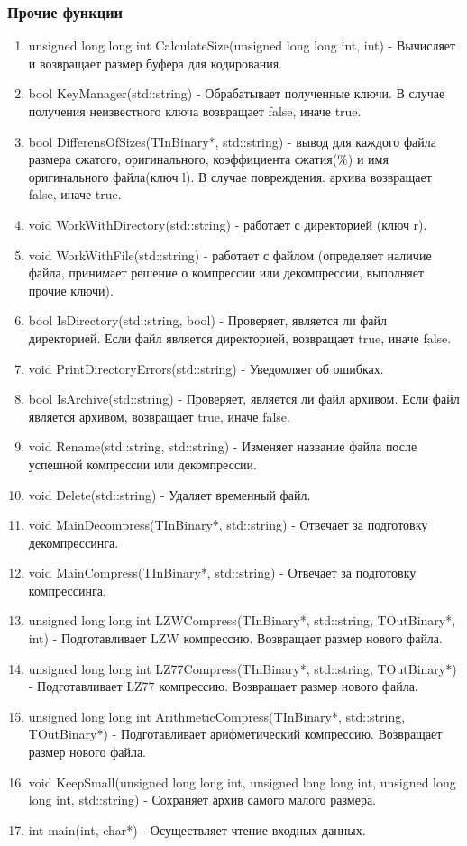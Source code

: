 \documentclass[12pt]{article}
\begin{document}
\subsubsection*{Прочие функции}
\noindent
\begin{enumerate}
	\item unsigned long long int CalculateSize(unsigned long long int, int) - Вычисляет и возвращает размер буфера для кодирования.
	\item bool KeyManager(std::string) - Обрабатывает полученные ключи. В случае получения неизвестного ключа возвращает false, иначе true.
	\item bool DifferensOfSizes(TInBinary*, std::string) - вывод для каждого файла размера сжатого, оригинального, коэффициента сжатия(\%) и имя оригинального файла(ключ l). В случае повреждения. архива возвращает false, иначе true.
	\item void WorkWithDirectory(std::string) - работает с директорией (ключ r).
	\item void WorkWithFile(std::string) - работает с файлом (определяет наличие файла, принимает решение о компрессии или декомпрессии, выполняет прочие ключи).
	\item bool IsDirectory(std::string, bool) - Проверяет, является ли файл директорией. Если файл является директорией, возвращает true, иначе false.
	\item void PrintDirectoryErrors(std::string) - Уведомляет об ошибках.
	\item bool IsArchive(std::string) - Проверяет, является ли файл архивом. Если файл является архивом, возвращает true, иначе false.
	\item void Rename(std::string, std::string) - Изменяет название файла после успешной компрессии или декомпрессии.
	\item void Delete(std::string) - Удаляет временный файл.
	\item void MainDecompress(TInBinary*, std::string) - Отвечает за подготовку декомпрессинга.
	\item void MainCompress(TInBinary*, std::string) - Отвечает за подготовку компрессинга.
	\item unsigned long long int LZWCompress(TInBinary*, std::string, TOutBinary*, int) - Подготавливает LZW компрессию. Возвращает размер нового файла.
	\item unsigned long long int LZ77Compress(TInBinary*, std::string, TOutBinary*) - Подготавливает LZ77 компрессию. Возвращает размер нового файла.
	\item unsigned long long int ArithmeticCompress(TInBinary*, std::string, TOutBinary*) - Подготавливает арифметический компрессию. Возвращает размер нового файла.
	\item void KeepSmall(unsigned long long int, unsigned long long int,
	unsigned long long int, std::string) - Сохраняет архив самого малого размера.
	\item int main(int, char*) - Осуществляет чтение входных данных.
\end{enumerate}
\end{document}
